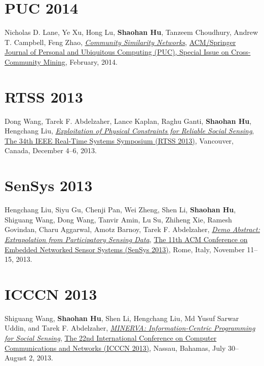 \section{\sc PUC 2014}\hypertarget{lane2013puc}{}
Nicholas D. Lane, Ye Xu, Hong Lu, \textbf{Shaohan Hu}, Tanzeem Choudhury, Andrew T. Campbell, Feng Zhao,
\href{http://link.springer.com/article/10.1007/s00779-013-0655-1}{\emph{Community Similarity Networks}},
\href{http://www.springer.com/computer/hci/journal/779}{\textsf{ACM/Springer Journal of Personal and Ubiquitous Computing (PUC), Special Issue on Cross-Community Mining}},
February, 2014.

\section{\sc RTSS 2013}\hypertarget{wang2013rtss}{}
Dong Wang, Tarek F. Abdelzaher, Lance Kaplan, Raghu Ganti, \textbf{Shaohan Hu}, Hengchang Liu,
\href{http://ieeexplore.ieee.org/document/6728876}{\emph{Exploitation of Physical Constraints for Reliable Social Sensing}},
\href{http://2013.ieee-rtss.org/}{\textsf{The 34th IEEE Real-Time Systems Symposium (RTSS 2013)}},
Vancouver, Canada, December 4--6, 2013.

\section{\sc SenSys 2013}\hypertarget{liu2013sensys}{}
Hengchang Liu, Siyu Gu, Chenji Pan, Wei Zheng, Shen Li, \textbf{Shaohan Hu}, Shiguang Wang, Dong Wang, Tanvir Amin, Lu Su, Zhiheng Xie, Ramesh Govindan, Charu Aggarwal, Amotz Barnoy, Tarek F. Abdelzaher,
\href{http://portal.acm.org/citation.cfm?id=2517431}{\emph{Demo Abstract: Extrapolation from Participatory Sensing Data}},
\href{http://sensys.acm.org/2013/}{\textsf{The 11th ACM Conference on Embedded Networked Sensor Systems (SenSys 2013)}},
Rome, Italy, November 11--15, 2013.


\section{\sc ICCCN 2013}\hypertarget{wang2013icccn}{}
Shiguang Wang, \textbf{Shaohan Hu}, Shen Li, Hengchang Liu, Md Yusuf Sarwar Uddin, and Tarek F. Abdelzaher,
\href{http://ieeexplore.ieee.org/document/6614152}{\emph{MINERVA: Information-Centric Programming for Social Sensing}},
\href{http://www.icccn.org/icccn13/}{\textsf{The 22nd International Conference on Computer Communications and Networks (ICCCN 2013)}},
Nassau, Bahamas, July 30--August 2, 2013.

